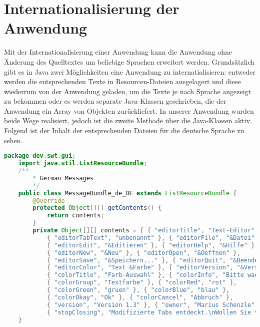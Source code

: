 \section{Internationalisierung der Anwendung}
Mit der Internationalisierung einer Anwendung kann die Anwendung ohne Änderung des Quelltextes um beliebige Sprachen erweitert werden.
Grundsätzlich gibt es in Java zwei Möglichkeiten eine Anwendung zu internatialisieren:
entweder werden die entsprechenden Texte in Resourcen-Dateien ausgelagert und diese wiederrum von der Anwendung geladen, um die Texte je nach Sprache
angezeigt zu bekommen oder es werden separate Java-Klassen geschrieben, die der Anwendung ein Array von Objekten zurückliefert.
In unserer Anwendung wurden beide Wege realisiert, jedoch ist die zweite Methode über die Java-Klassen aktiv.
Folgend ist der Inhalt der entsprechenden Dateien für die deutsche Sprache zu sehen.

\begin{lstlisting}[frame=single,language=JAVA,caption=Java Resourcen-Klasse]
    package dev.swt.gui;  
    import java.util.ListResourceBundle;     
    /**
        * German Messages
        */
    public class MessageBundle_de_DE extends ListResourceBundle {
        @Override
        protected Object[][] getContents() {
            return contents;
        }  
        private Object[][] contents = { { "editorTitle", "Text-Editor" },
            { "editorTabText", "unbenannt" }, { "editorFile", "&Datei" },
            { "editorEdit", "&Editieren" }, { "editorHelp", "&Hilfe" },
            { "editorNew", "&Neu" }, { "editorOpen", "&Oeffnen" },
            { "editorSave", "&Speichern..." }, { "editorQuit", "&Beenden" },
            { "editorColor", "Text &Farbe" }, { "editorVersion", "&Version" },
            { "colorTitle", "Farb-Auswahl" }, { "colorInfo", "Bitte waehlen Sie eine Textfarbe aus" },
            { "colorGroup", "Textfarbe" }, { "colorRed", "rot" },
            { "colorGreen", "gruen" }, { "colorBlue", "blau" },
            { "colorOkay", "Ok" }, { "colorCancel", "Abbruch" },
            { "version", "Version 1.3" }, { "owner", "Marius Schenzle" },
            { "stopClosing", "Modifizierte Tabs entdeckt.\nWollen Sie trotzdem schliessen?" } };
    }
\end{lstlisting}

\newpage



